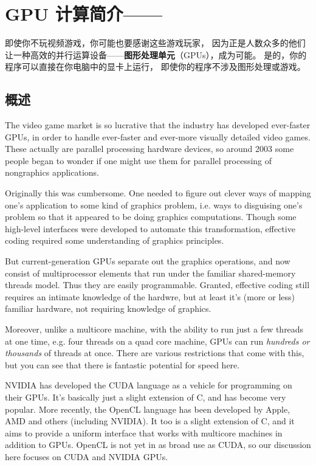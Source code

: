 \chapter{GPU 计算简介——}
\label{chap:cuda} 

即使你不玩视频游戏，你可能也要感谢这些游戏玩家，
因为正是人数众多的他们让一种高效的并行运算设备——{\bf 图形处理单元}（GPUs），成为可能。
是的，你的程序可以直接在你电脑中的显卡上运行，
即使你的程序不涉及图形处理或游戏。

\section{概述}

The video game market is so lucrative that the industry has developed
ever-faster GPUs, in order to handle ever-faster and ever-more visually
detailed video games.  These actually are parallel processing hardware
devices, so around 2003 some people began to wonder if one might use
them for parallel processing of nongraphics applications.

Originally this was cumbersome.  One needed to figure out clever ways of
mapping one's application to some kind of graphics problem, i.e. ways
to disguising one's problem so that it appeared to be doing graphics
computations.  Though some high-level interfaces were developed to
automate this transformation, effective coding required some
understanding of graphics principles.

But current-generation GPUs separate out the graphics operations, and
now consist of multiprocessor elements that run under the familiar
shared-memory threads model.  Thus they are easily programmable.
Granted, effective coding still requires an intimate knowledge of the
hardwre, but at least it's (more or less) familiar hardware, not
requiring knowledge of graphics.

Moreover, unlike a multicore machine, with the ability to run just a few
threads at one time, e.g. four threads on a quad core machine, GPUs can
run {\it  hundreds or thousands} of threads at once.  There are various
restrictions that come with this, but you can see that there is
fantastic potential for speed here.

NVIDIA has developed the CUDA language as a vehicle for programming on
their GPUs.  It's basically just a slight extension of C, and has become
very popular.  More recently, the OpenCL language has been developed by
Apple, AMD and others (including NVIDIA).  It too is a slight extension
of C, and it aims to provide a uniform interface that works with
multicore machines in addition to GPUs.  OpenCL is not yet in as broad
use as CUDA, so our discussion here focuses on CUDA and NVIDIA GPUs.

